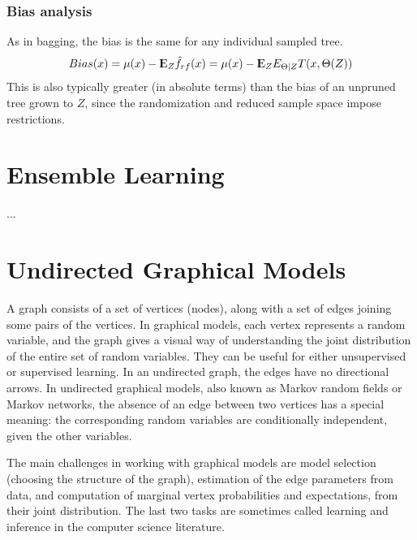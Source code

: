 \documentclass[12pt, letterpaper]{article}
\theoremstyle{definition}
\newcommand{\E}{{\rm I\kern-.3em E}}
\begin{document}
\subsubsection{Bias analysis}
As in bagging, the bias is the same for any individual sampled tree.
\begin{equation}
Bias(x) = \mu(x) - \E_Z\hat{f}_{rf}(x) = \mu(x) - \E_Z E_{\Theta|Z}T(x, \Theta(Z))
\end{equation}
This is also typically greater (in absolute terms) than the bias of an unpruned tree grown to $Z$, since the randomization and reduced sample space impose restrictions.

\newpage
\section{Ensemble Learning}
...

\newpage
\section{Undirected Graphical Models}

A graph consists of a set of vertices (nodes), along with a set of edges joining some pairs of the vertices. In graphical models, each vertex represents a random variable, and the graph gives a visual way of understanding the joint distribution of the entire set of random variables. They can be useful for either unsupervised or supervised learning. In an undirected graph, the edges have no directional arrows. In undirected graphical models, also known as Markov random fields or Markov networks, the absence of an edge between two vertices has a special meaning: the corresponding random variables are conditionally independent, given the other variables.

The main challenges in working with graphical models are model selection (choosing the structure of the graph), estimation of the edge parameters from data, and computation of marginal vertex probabilities and expectations, from their joint distribution. The last two tasks are sometimes called learning and inference in the computer science literature.
\end{document}
